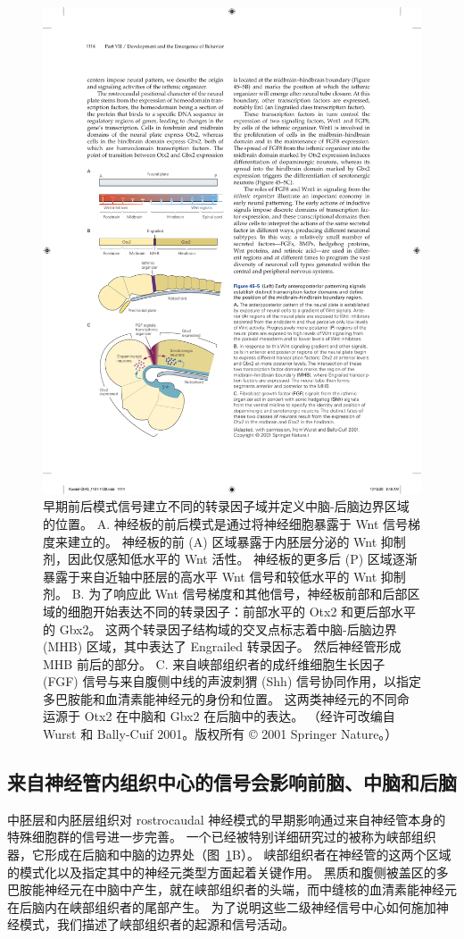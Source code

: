 \begin{figure}[htbp]
	\centering
	\includegraphics[width=0.5\linewidth]{chap45/fig_45_5}
	\caption{早期前后模式信号建立不同的转录因子域并定义中脑-后脑边界区域的位置。 A. 神经板的前后模式是通过将神经细胞暴露于 Wnt 信号梯度来建立的。 神经板的前 (A) 区域暴露于内胚层分泌的 Wnt 抑制剂，因此仅感知低水平的 Wnt 活性。 神经板的更多后 (P) 区域逐渐暴露于来自近轴中胚层的高水平 Wnt 信号和较低水平的 Wnt 抑制剂。 B. 为了响应此 Wnt 信号梯度和其他信号，神经板前部和后部区域的细胞开始表达不同的转录因子：前部水平的 Otx2 和更后部水平的 Gbx2。 这两个转录因子结构域的交叉点标志着中脑-后脑边界 (MHB) 区域，其中表达了 Engrailed 转录因子。 然后神经管形成 MHB 前后的部分。 C. 来自峡部组织者的成纤维细胞生长因子 (FGF) 信号与来自腹侧中线的声波刺猬 (Shh) 信号协同作用，以指定多巴胺能和血清素能神经元的身份和位置。 这两类神经元的不同命运源于 Otx2 在中脑和 Gbx2 在后脑中的表达。 （经许可改编自 Wurst 和 Bally-Cuif 2001。版权所有 © 2001 Springer Nature。）}
	\label{fig:45_5}
\end{figure}



\subsection{来自神经管内组织中心的信号会影响前脑、中脑和后脑}

中胚层和内胚层组织对 rostrocaudal 神经模式的早期影响通过来自神经管本身的特殊细胞群的信号进一步完善。
一个已经被特别详细研究过的被称为峡部组织器，它形成在后脑和中脑的边界处（图~\ref{fig:45_5}B）。
峡部组织者在神经管的这两个区域的模式化以及指定其中的神经元类型方面起着关键作用。
黑质和腹侧被盖区的多巴胺能神经元在中脑中产生，就在峡部组织者的头端，而中缝核的血清素能神经元在后脑内在峡部组织者的尾部产生。
为了说明这些二级神经信号中心如何施加神经模式，我们描述了峡部组织者的起源和信号活动。



